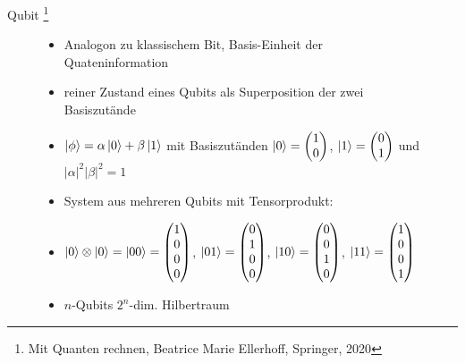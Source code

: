 \documentclass[aspectratio=1610, 9pt]{beamer}
\begin{document}
\begin{frame}{Qubit \footnote[200]{Mit Quanten rechnen, Beatrice Marie Ellerhoff, Springer, 2020}}
  \begin{figure}
    \begin{minipage}{0.49\textwidth}
      \begin{itemize}
        \item Analogon zu klassischem Bit, Basis-Einheit der Quateninformation
        \item reiner Zustand eines Qubits als Superposition der zwei Basiszutände
        \item[] $\ket{\phi} = \alpha \ket{0} + \beta \ket{1} $ mit Basiszutänden $\ket{0} = \begin{pmatrix}1\\0\end{pmatrix}$, $\ket{1} = \begin{pmatrix}0\\1\end{pmatrix}$ und $|\alpha|^2 |\beta|^2 = 1$
        \item System aus mehreren Qubits mit Tensorprodukt:
        \item[] $\ket{0} \otimes \ket{0} = \ket{00} = \begin{pmatrix}1\\0\\0\\0\end{pmatrix}$, $\ket{01} = \begin{pmatrix}0\\1\\0\\0\end{pmatrix}$, $\ket{10} = \begin{pmatrix}0\\0\\1\\0\end{pmatrix}$, $\ket{11} = \begin{pmatrix}1\\0\\0\\1\end{pmatrix}$
        \item $n$-Qubits \rightarrow $2^n$-dim. Hilbertraum
      \end{itemize}
    \end{minipage}
    \hfill
    \begin{minipage}{0.49\textwidth}
      \begin{itemize}

\end{itemize}
\end{minipage}
\end{figure}
\end{frame}
\end{document}
